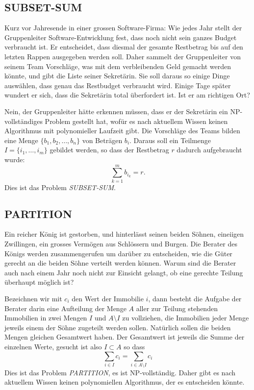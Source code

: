 \subsection{SUBSET-SUM}
Kurz vor Jahresende in einer grossen Software-Firma: Wie jedes Jahr stellt
der Gruppenleiter Software-Entwicklung fest, dass noch nicht sein ganzes
Budget verbraucht ist.  Er entscheidet, dass diesmal der gesamte Restbetrag
bis auf den letzten Rappen
ausgegeben werden soll.  Daher sammelt der Gruppenleiter von seinem
Team Vorschläge, was mit dem verbleibenden Geld gemacht werden könnte,
und gibt die Liste seiner Sekretärin.  Sie soll daraus so einige Dinge
auswählen, dass genau das Restbudget verbraucht wird. Einige Tage später
wundert er sich, dass die Sekretärin total überfordert ist. Ist er
am richtigen Ort?

\medskip

Nein, der Gruppenleiter hätte erkennen müssen, dass er der Sekretärin
ein NP-vollständiges Problem gestellt hat, wofür es nach aktuellem
Wissen keinen Algorithmus mit polynomieller Laufzeit gibt. Die Vorschläge
des Teams bilden eine Menge $\{b_1,b_2,\dots,b_n\}$ von Beträgen $b_i$.
Daraus soll ein Teilmenge $I=\{i_1,\dots,i_m\}$ gebildet werden, so dass
der Restbetrag $r$ dadurch aufgebraucht wurde:
\[
\sum_{k=1}^m b_{i_k} = r.
\]
Dies ist das Problem {\it SUBSET-SUM}.

\subsection{PARTITION}
Ein reicher König ist gestorben, und hinterlässt seinen beiden
Söhnen, eineiigen Zwillingen, ein grosses Vermögen aus Schlössern
und Burgen. Die Berater des Königs werden zusammengerufen um
darüber zu entscheiden, wie die Güter gerecht an die beiden Söhne
verteilt werden können. Warum sind die Berater auch nach einem Jahr
noch nicht zur Einsicht gelangt, ob eine gerechte Teilung überhaupt
möglich ist?

Bezeichnen wir mit $c_i$ den Wert der Immobilie $i$, dann besteht
die Aufgabe der Berater darin eine Aufteilung der Menge $A$ aller 
zur Teilung stehenden Immobilien in zwei Mengen $I$ und $A\setminus I$
zu vollziehen, die Immobilien jeder Menge jeweils einem der Söhne zugeteilt
werden sollen.
Natürlich sollen die beiden Mengen gleichen Gesamtwert haben.
Der Gesamtwert ist jeweils die Summe der einzelnen Werte, gesucht ist also
$I\subset A$ so dass
\[
\sum_{i\in I}c_i =\sum_{i\in A\setminus I}c_i
\]
Dies ist das Problem {\it PARTITION}, es ist NP-vollständig.
Daher gibt es nach aktuellem Wissen keinen polynomiellen Algorithmus,
der es entscheiden könnte.


